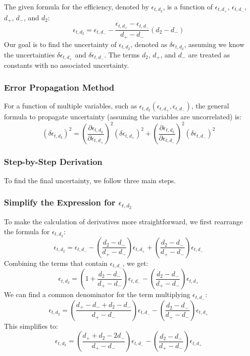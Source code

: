 \documentclass[11pt]{article}
\begin{document}
The given formula for the efficiency, denoted by $\epsilon_{t,d_{2}}$, is a function of $\epsilon_{t,d_{+}}$, $\epsilon_{t,d_{-}}$, $d_+$, $d_-$, and $d_2$:
$$
\epsilon_{t,d_{2}} = \epsilon_{t,d_{-}} - \frac{\epsilon_{t,d_{+}} - \epsilon_{t,d_{-}}}{d_+ - d_-} (d_2 - d_-)
$$
Our goal is to find the uncertainty of $\epsilon_{t,d_{2}}$, denoted as $\delta\epsilon_{t,d_{2}}$, assuming we know the uncertainties $\delta\epsilon_{t,d_{+}}$ and $\delta\epsilon_{t,d_{-}}$. The terms $d_2$, $d_+$, and $d_-$ are treated as constants with no associated uncertainty.

\subsubsection{Error Propagation Method}

For a function of multiple variables, such as $\epsilon_{t,d_{2}}(\epsilon_{t,d_{+}}, \epsilon_{t,d_{-}})$, the general formula to propagate uncertainty (assuming the variables are uncorrelated) is:
$$
(\delta\epsilon_{t,d_{2}})^2 = \left(\frac{\partial \epsilon_{t,d_{2}}}{\partial \epsilon_{t,d_{+}}}\right)^2 (\delta\epsilon_{t,d_{+}})^2 + \left(\frac{\partial \epsilon_{t,d_{2}}}{\partial \epsilon_{t,d_{-}}}\right)^2 (\delta\epsilon_{t,d_{-}})^2
$$

\clearpage

\subsubsection{Step-by-Step Derivation}

To find the final uncertainty, we follow three main steps.

\subsubsection{Simplify the Expression for $\epsilon_{t,d_{2}}$}

To make the calculation of derivatives more straightforward, we first rearrange the formula for $\epsilon_{t,d_{2}}$:
$$
\epsilon_{t,d_{2}} = \epsilon_{t,d_{-}} - \left(\frac{d_2 - d_-}{d_+ - d_-}\right)\epsilon_{t,d_{+}} + \left(\frac{d_2 - d_-}{d_+ - d_-}\right)\epsilon_{t,d_{-}}
$$
Combining the terms that contain $\epsilon_{t,d_{-}}$, we get:
$$
\epsilon_{t,d_{2}} = \left(1 + \frac{d_2 - d_-}{d_+ - d_-}\right)\epsilon_{t,d_{-}} - \left(\frac{d_2 - d_-}{d_+ - d_-}\right)\epsilon_{t,d_{+}}
$$
We can find a common denominator for the term multiplying $\epsilon_{t,d_{-}}$:
$$
\epsilon_{t,d_{2}} = \left(\frac{d_+ - d_- + d_2 - d_-}{d_+ - d_-}\right)\epsilon_{t,d_{-}} - \left(\frac{d_2 - d_-}{d_+ - d_-}\right)\epsilon_{t,d_{+}}
$$
This simplifies to:
$$
\epsilon_{t,d_{2}} = \left(\frac{d_+ + d_2 - 2d_-}{d_+ - d_-}\right)\epsilon_{t,d_{-}} - \left(\frac{d_2 - d_-}{d_+ - d_-}\right)\epsilon_{t,d_{+}}
$$
\end{document}
